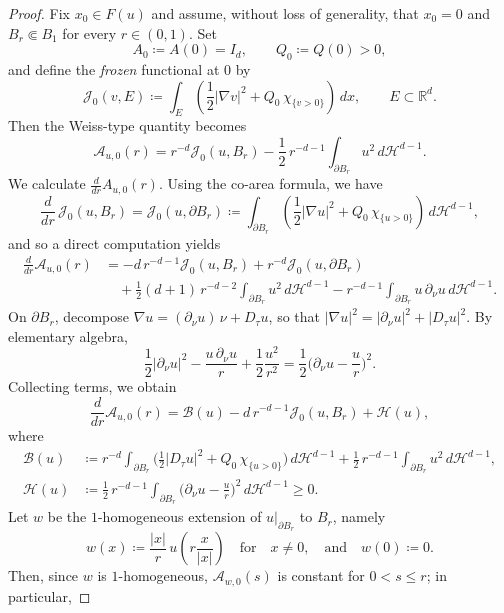 \documentclass[10pt,a4paper]{amsart}
\begin{document}
\begin{proof}
Fix $x_0\in F(u)$ and assume, without loss of generality, that $x_0=0$ and $B_r\Subset B_1$ for every $r\in(0,1)$.
Set
\[
    A_0 \coloneqq A(0) = I_d, \qquad Q_0\coloneqq Q(0)>0,
\]
and define the \emph{frozen} functional at $0$ by
\[
    \mathcal J_{0}(v,E)\coloneqq \int_{E}\left(\frac12|\nabla v|^2+Q_0\,\chi_{\{v>0\}}\right)\,dx, \qquad E\subset \mathbb R^d.
\]
Then the Weiss-type quantity becomes
\[
    \mathcal A_{u,0}(r)=r^{-d}\mathcal J_0(u,B_r)-\frac12\,r^{-d-1}\int_{\partial B_r}u^2\,d\mathcal H^{d-1}.
\]
We calculate $\frac{d}{dr} A_{u,0}(r)$. Using the co-area formula, we have
\[
    \frac{d}{dr}\,\mathcal J_0(u,B_r)=\mathcal J_0(u,\partial B_r)
    \coloneqq \int_{\partial B_r}\left(\frac12|\nabla u|^2+Q_0\,\chi_{\{u>0\}}\right)\,d\mathcal H^{d-1},
\]
and so a direct computation yields
\begin{align*}
    \frac{d}{dr}\mathcal A_{u,0}(r)
    &= -d\,r^{-d-1}\mathcal J_0(u,B_r)+r^{-d}\mathcal J_0(u,\partial B_r) \\
    &\quad +\frac12(d+1)\,r^{-d-2}\int_{\partial B_r}u^2\,d\mathcal H^{d-1}
    - r^{-d-1}\int_{\partial B_r}u\,\partial_\nu u\,d\mathcal H^{d-1}.
\end{align*}
On $\partial B_r$, decompose $\nabla u = (\partial_\nu u)\,\nu + D_\tau u$, so that $|\nabla u|^2=|\partial_\nu u|^2+|D_\tau u|^2$.
By elementary algebra,
\[
    \frac12|\partial_\nu u|^2-\frac{u\,\partial_\nu u}{r}+\frac12\frac{u^2}{r^2}
    =\frac12\Big(\partial_\nu u-\frac{u}{r}\Big)^2.
\]
Collecting terms, we obtain
\begin{equation}\label{eq:Weiss-derivative}
    \frac{d}{dr}\mathcal A_{u,0}(r) = \mathcal B(u)-d\,r^{-d-1}\mathcal J_0(u,B_r)+\mathcal H(u),
\end{equation}
where
\begin{align*}
\mathcal B(u)
&\coloneqq r^{-d}\int_{\partial B_r}\Big(\tfrac12|D_\tau u|^2+Q_0\,\chi_{\{u>0\}}\Big)\,d\mathcal H^{d-1}
+\frac12\,r^{-d-1}\int_{\partial B_r}u^2\,d\mathcal H^{d-1},\\
\mathcal H(u)
&\coloneqq \frac12\,r^{-d-1}\int_{\partial B_r}\Big(\partial_\nu u-\frac{u}{r}\Big)^2\,d\mathcal H^{d-1}\ge 0.
\end{align*}
Let $w$ be the $1$-homogeneous extension of $u|_{\partial B_r}$ to $B_r$, namely
\[
    w(x)\coloneqq \frac{|x|}{r}\,u\!\left(r\frac{x}{|x|}\right)\quad \text{for} \quad x \not = 0, \quad \text{and}\quad w(0)\coloneqq 0.
\]
Then, since $w$ is $1$-homogeneous, $\mathcal A_{w,0}(s)$ is constant for $0<s\le r$; in particular,

\end{proof}
\end{document}
